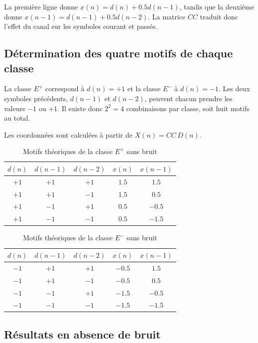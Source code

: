 La première ligne donne $x(n)=d(n)+0.5d(n-1)$, tandis que la deuxième donne $x(n-1)=d(n-1)+0.5d(n-2)$. La matrice $CC$ traduit donc l'effet du canal sur les symboles courant et passés.

\subsection{Détermination des quatre motifs de chaque classe}

La classe $E^+$ correspond à $d(n)=+1$ et la classe $E^-$ à $d(n)=-1$. Les deux symboles précédents, $d(n-1)$ et $d(n-2)$, peuvent chacun prendre les valeurs $-1$ ou $+1$. Il existe donc $2^2=4$ combinaisons par classe, soit huit motifs au total.

Les coordonnées sont calculées à partir de $X(n)=CC\,D(n)$.

\begin{table}[H]
\centering
\caption{Motifs théoriques de la classe $E^+$ sans bruit}
\label{tab:yassine-motifs-plus}
\begin{tabular}{ccccc}
\toprule
$d(n)$ & $d(n-1)$ & $d(n-2)$ & $x(n)$ & $x(n-1)$\\
\midrule
$+1$ & $+1$ & $+1$ & $1.5$ & $1.5$\\
$+1$ & $+1$ & $-1$ & $1.5$ & $0.5$\\
$+1$ & $-1$ & $+1$ & $0.5$ & $-0.5$\\
$+1$ & $-1$ & $-1$ & $0.5$ & $-1.5$\\
\bottomrule
\end{tabular}
\end{table}

\begin{table}[H]
\centering
\caption{Motifs théoriques de la classe $E^-$ sans bruit}
\label{tab:yassine-motifs-moins}
\begin{tabular}{ccccc}
\toprule
$d(n)$ & $d(n-1)$ & $d(n-2)$ & $x(n)$ & $x(n-1)$\\
\midrule
$-1$ & $+1$ & $+1$ & $-0.5$ & $1.5$\\
$-1$ & $+1$ & $-1$ & $-0.5$ & $0.5$\\
$-1$ & $-1$ & $+1$ & $-1.5$ & $-0.5$\\
$-1$ & $-1$ & $-1$ & $-1.5$ & $-1.5$\\
\bottomrule
\end{tabular}
\end{table}

\subsection{Résultats en absence de bruit}


